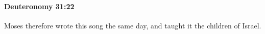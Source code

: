
		\paragraph{Deuteronomy 31:22} %
			\label{DEUTERONOMY-31-22}

			Moses therefore wrote this song the same day, and taught it the children of Israel.


